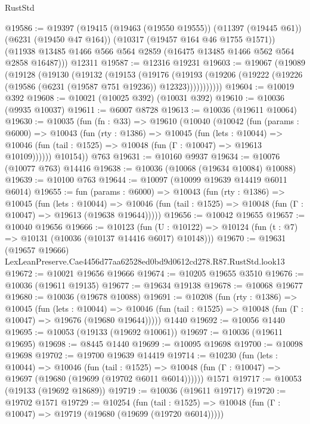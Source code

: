 \begin{lexlean}{RustStd}
\begin{coremodule}
{{@19586 := @19397
    (@19415
      (@19463 (@19550 @19555))
      (@11397 (@19445 @61))
      (@6231 (@19450 @47 @164))
      (@10317 (@19457 @164 @46 @1755 @1571))
      (@11938 @13485 @1466 @566 @564 @2859 (@16475 @13485 @1466 @562 @564 @2858 @16487)))
    @12311
@19587 := @12316 @19231
@19603 := @19067
    (@19089
      (@19128
        (@19130
          (@19132
            (@19153
              (@19176
                (@19193
                  (@19206 (@19222 (@19226 (@19586 (@6231 (@19587 @751 @19236)) @12323)))))))))))
@19604 := @10019 @392
@19608 := @10021 (@10025 @392) (@10031 @392)
@19610 := @10036 (@9935 @10037)
@19611 := @6007 @8728
@19613 := @10036 (@19611 @10064)
@19630 := @10035
    (fun (fn : @33) =>
    @19610
      (@10040
        (@10042
          (fun (params : @6000) =>
          @10043
            (fun (rty : @1386) =>
            @10045
              (fun (lets : @10044) =>
              @10046 (fun (tail : @1525) => @10048 (fun (Γ : @10047) => @19613 @10109))))))
        @10154))
    @763
@19631 := @10160 @9937
@19634 := @10076 (@10077 @763) @14416
@19638 := @10036 (@10068 (@19634 @10084) @10088)
@19639 := @10100 @763
@19644 := @10097 (@10099 @19639 @14419 @6011 @6014)
@19655 := fun (params : @6000) =>
  @10043
    (fun (rty : @1386) =>
    @10045
      (fun (lets : @10044) =>
      @10046 (fun (tail : @1525) => @10048 (fun (Γ : @10047) => @19613 (@19638 @19644)))))
@19656 := @10042 @19655
@19657 := @10040 @19656
@19666 := @10123
    (fun (U : @10122) => @10124 (fun (t : @7) => @10131 (@10036 (@10137 @14416 @6017) @10148)))
@19670 := @19631
    (@19657 @19666)
    LexLeanPreserve.Cae4456d77aa62528ed0bd9d0612cd278.R87.RustStd.look13
@19672 := @10021 @19656 @19666
@19674 := @10205 @19655 @3510
@19676 := @10036 (@19611 @19135)
@19677 := @19634 @19138
@19678 := @10068 @19677
@19680 := @10036 (@19678 @10088)
@19691 := @10208
    (fun (rty : @1386) =>
    @10045
      (fun (lets : @10044) =>
      @10046 (fun (tail : @1525) => @10048 (fun (Γ : @10047) => @19676 (@19680 @19644)))))
    @1440
@19692 := @10056 @1440
@19695 := @10053 (@19133 (@19692 @10061))
@19697 := @10036 (@19611 @19695)
@19698 := @8445 @1440
@19699 := @10095 @19698
@19700 := @10098 @19698
@19702 := @19700 @19639 @14419
@19714 := @10230
    (fun (lets : @10044) =>
    @10046
      (fun (tail : @1525) =>
      @10048 (fun (Γ : @10047) => @19697 (@19680 (@19699 (@19702 @6011 @6014))))))
    @1571
@19717 := @10053 (@19133 (@19692 @18689))
@19719 := @10036 (@19611 @19717)
@19720 := @19702 @1571
@19729 := @10254
    (fun (tail : @1525) => @10048 (fun (Γ : @10047) => @19719 (@19680 (@19699 (@19720 @6014)))))
}}
\end{coremodule}
\end{lexlean}

